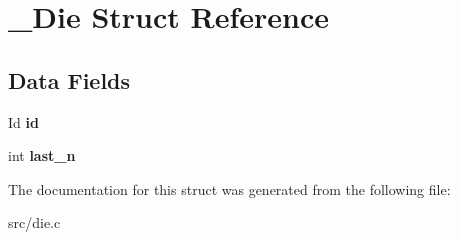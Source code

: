 \hypertarget{struct__Die}{}\section{\+\_\+\+Die Struct Reference}
\label{struct__Die}
\subsection*{Data Fields}
\begin{DoxyCompactItemize}
\item 
\mbox{\label{struct__Die_a0887af562dda760409957f13619d36f1}} 
Id {\bfseries id}
\item 
\mbox{\label{struct__Die_abf73744a544920c64d79d84d964be62d}} 
int {\bfseries last\+\_\+n}
\end{DoxyCompactItemize}


The documentation for this struct was generated from the following file\+:\begin{DoxyCompactItemize}
\item 
src/die.\+c\end{DoxyCompactItemize}
